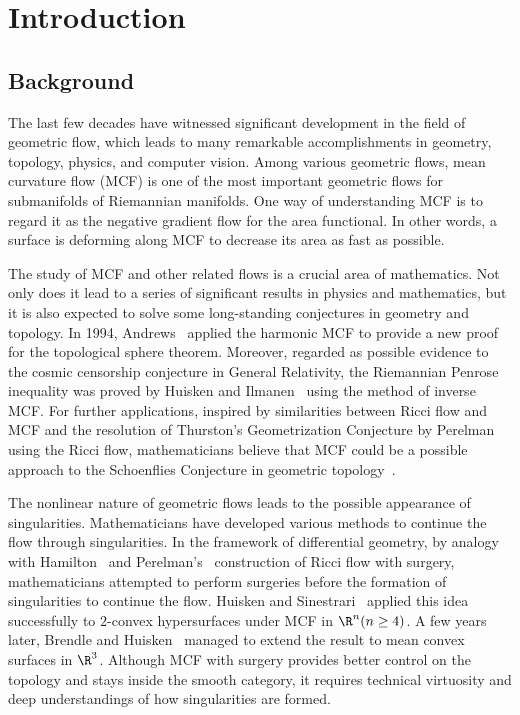 %

\chapter{Introduction}

\section{Background}

The last few decades have witnessed significant development in the field of geometric flow, which leads to many remarkable accomplishments in geometry, topology, physics, and computer vision. Among various geometric flows, mean curvature flow (MCF) is one of the most important geometric flows for submanifolds of Riemannian manifolds. One way of understanding MCF is to regard it as the negative gradient flow for the area functional. In other words, a surface is deforming along MCF to decrease its area as fast as possible.

The study of MCF and other related flows is a crucial area of mathematics. Not only does it lead to a series of significant results in physics and mathematics, but it is also expected to solve some long-standing conjectures in geometry and topology. In 1994, Andrews~\cite{andrews_contraction_1994} applied the harmonic MCF to provide a new proof for the topological sphere theorem. Moreover, regarded as possible evidence to the cosmic censorship conjecture in General Relativity, the Riemannian Penrose inequality was proved by Huisken and Ilmanen~\cite{huisken_inverse_2001} using the method of inverse MCF. For further applications, inspired by similarities between Ricci flow and MCF and the resolution of Thurston's Geometrization Conjecture by Perelman using the Ricci flow, mathematicians believe that MCF could be a possible approach to the Schoenflies Conjecture in geometric topology~\cite{chodosh2020mean,bernstein2020closed}.

The nonlinear nature of geometric flows leads to the possible appearance of singularities. Mathematicians have developed various methods to continue the flow through singularities. In the framework of differential geometry, by analogy with Hamilton~\cite{Hamilton1997FourmanifoldsWP} and Perelman's~\cite{perelman2002entropy,perelman2003ricci} construction of Ricci flow with surgery, mathematicians attempted to perform surgeries before the formation of singularities to continue the flow. Huisken and Sinestrari~\cite{Huisken2009MeanCF} applied this idea successfully to $2$-convex hypersurfaces under MCF in $\R^n(n \geq 4)$. A few years later, Brendle and Huisken~\cite{brendle_mean_2016} managed to extend the result to mean convex surfaces in $\R^3$. Although MCF with surgery provides better control on the topology and stays inside the smooth category, it requires technical virtuosity and deep understandings of how singularities are formed.

